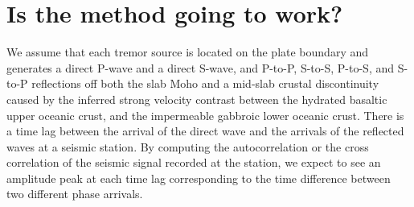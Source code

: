 \documentclass[workdone.tex]{subfiles}
\begin{document}
%
%
%
%
%
%
%

\section{Is the method going to work?}

We assume that each tremor source is located on the plate boundary and generates a direct P-wave and a direct S-wave, and P-to-P, S-to-S, P-to-S, and S-to-P reflections off both the slab Moho and a mid-slab crustal discontinuity caused by the inferred strong velocity contrast between the hydrated basaltic upper oceanic crust, and the impermeable gabbroic lower oceanic crust. There is a time lag between the arrival of the direct wave and the arrivals of the reflected waves at a seismic station. By computing the autocorrelation or the cross correlation of the seismic signal recorded at the station, we expect to see an amplitude peak at each time lag corresponding to the time difference between two different phase arrivals. \\
\end{document}
